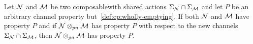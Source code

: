 \begin{theorem}\label{thm:inc-design}
 Let $\mathcal{N}$ and $\mathcal{M}$ be two composable\linebreak \AIOPNs with shared actions  $\Sigma_\mathcal{N} \cap \Sigma_\mathcal{M}$
and let  $P$ be an arbitrary channel property but~\ref{def:cp:wholly-emptying}.
If both $\mathcal{N}$ and $\mathcal{M}$ have property $P$ and if $\mathcal{N} \otimes_{pn} \mathcal{M}$ has property $P$ with respect to the new channels
$\Sigma_\mathcal{N} \cap \Sigma_\mathcal{M}$, then $\mathcal{N} \otimes_{pn} \mathcal{M}$ has property $P$.
\end{theorem}
